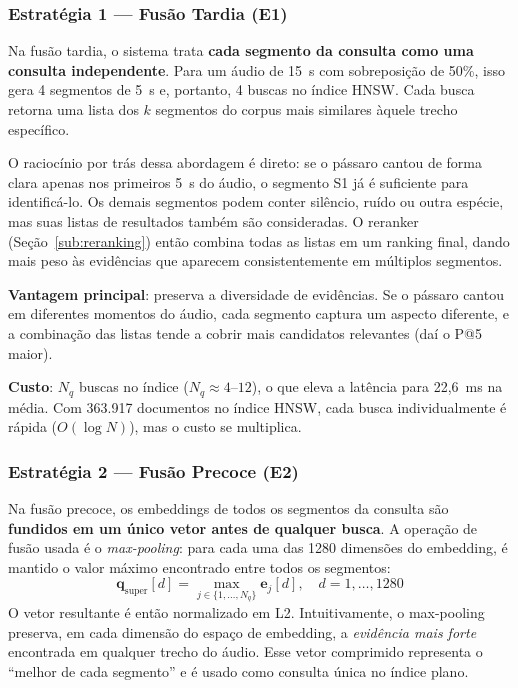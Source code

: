 \documentclass[12pt]{article}
\begin{document}
\subsubsection{Estratégia 1 --- Fusão Tardia (E1)}

Na fusão tardia, o sistema trata \textbf{cada segmento da consulta como uma
consulta independente}. Para um áudio de 15~s com sobreposição de 50\%, isso
gera 4 segmentos de 5~s e, portanto, 4 buscas no índice HNSW. Cada busca
retorna uma lista dos $k$ segmentos do corpus mais similares àquele trecho
específico.

O raciocínio por trás dessa abordagem é direto: se o pássaro cantou de forma
clara apenas nos primeiros 5~s do áudio, o segmento S1 já é suficiente para
identificá-lo. Os demais segmentos podem conter silêncio, ruído ou outra
espécie, mas suas listas de resultados também são consideradas. O reranker
(Seção~\ref{sub:reranking}) então combina todas as listas em um ranking final,
dando mais peso às evidências que aparecem consistentemente em múltiplos
segmentos.

\textbf{Vantagem principal}: preserva a diversidade de evidências. Se o pássaro
cantou em diferentes momentos do áudio, cada segmento captura um aspecto
diferente, e a combinação das listas tende a cobrir mais candidatos relevantes
(daí o P@5 maior).

\textbf{Custo}: $N_q$ buscas no índice ($N_q \approx 4$--$12$), o que eleva
a latência para 22,6~ms na média. Com 363.917 documentos no índice HNSW, cada
busca individualmente é rápida ($O(\log N)$), mas o custo se multiplica.

\subsubsection{Estratégia 2 --- Fusão Precoce (E2)}

Na fusão precoce, os embeddings de todos os segmentos da consulta são
\textbf{fundidos em um único vetor antes de qualquer busca}. A operação de
fusão usada é o \textit{max-pooling}: para cada uma das 1280 dimensões do
embedding, é mantido o valor máximo encontrado entre todos os segmentos:
\begin{equation}
  \mathbf{q}_{\text{super}}[d] = \max_{j \in \{1,\ldots,N_q\}}
  \mathbf{e}_j[d], \quad d = 1,\ldots,1280
  \label{eq:super}
\end{equation}
O vetor resultante é então normalizado em L2. Intuitivamente, o max-pooling
preserva, em cada dimensão do espaço de embedding, a \emph{evidência mais
forte} encontrada em qualquer trecho do áudio. Esse vetor comprimido representa
o ``melhor de cada segmento'' e é usado como consulta única no índice plano.
\end{document}
